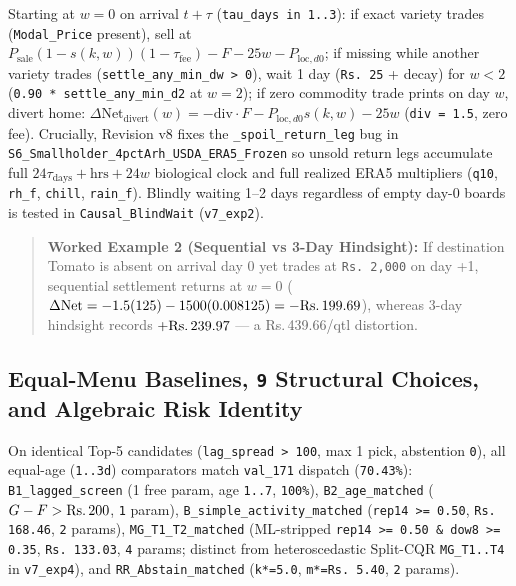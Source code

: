 \documentclass[11pt,a4paper]{article}
\begin{document}
Starting at $w = 0$ on arrival $t + \tau$ (\texttt{tau\_days in 1..3}): if exact variety trades (\texttt{Modal\_Price} present), sell at $P_{\text{sale}}(1 - s(k, w))(1 - \tau_{\text{fee}}) - F - 25w - P_{\text{loc}, d0}$; if missing while another variety trades (\texttt{settle\_any\_min\_dw > 0}), wait 1 day (\texttt{Rs.\,25} + decay) for $w < 2$ (\texttt{0.90 * settle\_any\_min\_d2} at $w = 2$); if zero commodity trade prints on day $w$, divert home: $\Delta\text{Net}_{\text{divert}}(w) = -\text{div}\cdot F - P_{\text{loc}, d0} s(k, w) - 25w$ (\texttt{div = 1.5}, zero fee). Crucially, Revision v8 fixes the \texttt{\_spoil\_return\_leg} bug in \texttt{S6\_Smallholder\_4pctArh\_USDA\_ERA5\_Frozen} so unsold return legs accumulate full $24\tau_{\text{days}} + \text{hrs} + 24w$ biological clock and full realized ERA5 multipliers (\texttt{q10}, \texttt{rh\_f}, \texttt{chill}, \texttt{rain\_f}). Blindly waiting 1--2 days regardless of empty day-0 boards is tested in \texttt{Causal\_BlindWait} (\texttt{v7\_exp2}).

\begin{quote}
\textbf{Worked Example 2 (Sequential vs 3-Day Hindsight):} If destination Tomato is absent on arrival day 0 yet trades at \texttt{Rs.\,2,000} on day +1, sequential settlement returns at $w = 0$ ($\Delta\text{Net} = -1.5(125) - 1500(0.008125) = -\text{Rs.\,}199.69$), whereas 3-day hindsight records $+\text{Rs.\,}239.97$ --- a Rs.\,439.66/qtl distortion.

\end{quote}

\subsection{Equal-Menu Baselines, \texttt{9} Structural Choices, and Algebraic Risk Identity}

On identical Top-5 candidates (\texttt{lag\_spread > 100}, max 1 pick, abstention \texttt{0}), all equal-age (\texttt{1..3d}) comparators match \texttt{val\_171} dispatch (\texttt{70.43\%}): \texttt{B1\_lagged\_screen} (1 free param, age \texttt{1..7}, \texttt{100\%}), \texttt{B2\_age\_matched} ($G - F > \text{Rs.\,}200$, \texttt{1} param), \texttt{B\_simple\_activity\_matched} (\texttt{rep14 >= 0.50}, \texttt{Rs.\,168.46}, \texttt{2} params), \texttt{MG\_T1\_T2\_matched} (ML-stripped \texttt{rep14 >= 0.50 \& dow8 >= 0.35}, \texttt{Rs.\,133.03}, \texttt{4} params; distinct from heteroscedastic Split-CQR \texttt{MG\_T1..T4} in \texttt{v7\_exp4}), and \texttt{RR\_Abstain\_matched} (\texttt{k*=5.0}, \texttt{m*=Rs.\,5.40}, \texttt{2} params).
\end{document}
